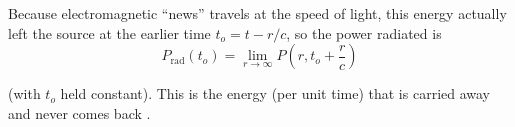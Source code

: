 \documentclass{article}
\begin{document}
Because electromagnetic ``news'' travels at the speed of light, this energy actually left the source at the earlier time $t_o = t - r/c$, so the power radiated is
\begin{equation*}
    P_{\text{rad}} \left( t_o \right) = \lim_{r \to \infty} P \left( r, t_o + \frac{r}{c} \right)
\end{equation*}

(with $t_o$ held constant). This is the energy (per unit time) that is carried away and never comes back \cite{griffiths}.

\printbibliography[heading=bibintoc,title={References}]

\printbibliography[heading=subbibintoc,type=book,title={Books only}]

\printbibliography[heading=subbibintoc,keyword={physics},title={Physics-related only}]
\end{document}
